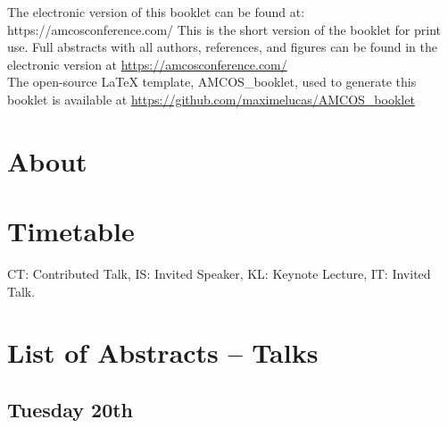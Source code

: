 \documentclass[openany, parskip=full, 12pt, a4]{scrbook}
\begin{document}
	
	
\mbox{}
\thispagestyle{empty}
\vfill
\begin{center}
	\ifOnline
	The electronic version of this booklet can be found at: \\
	https://amcosconference.com/
	\else
	This is the short version of the booklet for print use. Full abstracts with all authors, references, and figures can be found in the electronic version at \url{https://amcosconference.com/}
	\fi %
	\\[20pt] %
	The open-source \LaTeX{} template, AMCOS\_booklet, used to generate this booklet is available at \url{https://github.com/maximelucas/AMCOS\_booklet}
\end{center}

\newpage

\tableofcontents

\chapter{About}



\chapter{Timetable}

CT: Contributed Talk, IS: Invited Speaker, KL: Keynote Lecture, IT: Invited Talk.


\chapter{List of Abstracts -- Talks}

\section{Tuesday 20th}
\end{document}
